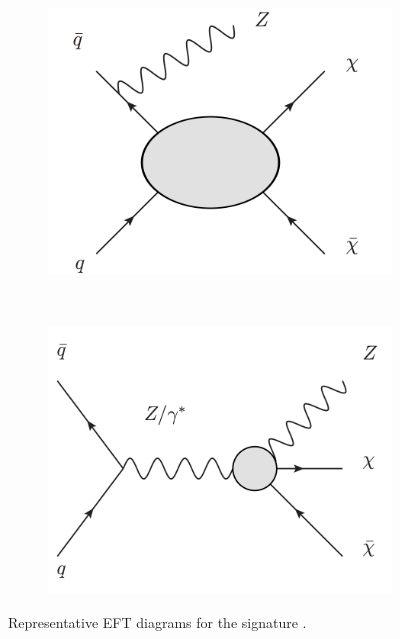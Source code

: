 \begin{figure}[htb]
    \centering
    \begin{subfigure}[b]{0.35\textwidth}
        \includegraphics[width=\textwidth]{Figures/eft1.png}
        \label{fig:eft1}
    \end{subfigure}
    ~ %
    \begin{subfigure}[b]{0.35\textwidth}
        \includegraphics[width=\textwidth]{Figures/eft2.png}
        \label{fig:eft2}
    \end{subfigure}
    \caption{Representative EFT diagrams for the \monoZ signature \cite{Carpenter:2012rg}.}
\label{fig:efts}
\end{figure}

